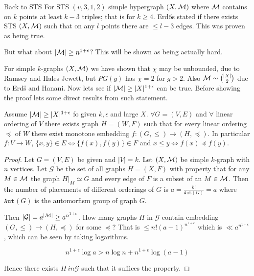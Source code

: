 \begin{topic}{Back to STS}
	For STS $(v,3,1,2)$ simple hypergraph $(X, \mathcal{M})$ where $\mathcal{M}$ contains on $k$ points at least $k-3$ triples; that is for $k \geq 4$. Erd\H os stated if there exists STS $(X, \mathcal{M})$ such that on any $l$ points there are $\leq l-3$ edges. This was proven as being true.
	
	But what about $|\mathcal{M}| \geq n^{1 + \epsilon}$? This will be shown as being actually hard.
\end{topic}

For simple $k$-graphs $(X, \mathcal{M})$ we have shown that $\chi$ may be unbounded, due to Ramsey and Hales Jewett, but $PG(g)$ has $\chi = 2$ for $g > 2$. Also $\mathcal{M} \sim \binom{|X|}{2}$ due to Erd\H s and Hanani. Now lets see if $|\mathcal{M}| \geq |X|^{1 + \epsilon}$ can be true. Before showing the proof lets some direct results from such statement.

\begin{thm}
	Assume $|\mathcal{M}| \geq |X|^{1 + \epsilon}$ fo given $k, \epsilon$ and large $X$. $\forall G = (V,E)$ and $\forall$ linear ordering of $V$ there exists graph $H = (W,F)$ such that for every linear ordering $\preceq$ of $W$ there exist monotone embedding $f : (G, \leq) \to (H, \preceq)$. In particular $f : V \to W$, $\{x,y\} \in E \iff \{f(x), f(y)\} \in F$ and $x \leq y \iff f(x) \preceq f(y)$.
\end{thm}

\begin{proof}
	Let $G = (V,E)$ be given and $|V| = k$. Let $(X, \mathcal{M})$ be simple $k$-graph with $n$ vertices. Let $\mathcal{G}$ be the set of all graphs $H = (X,F)$ with property that for any $M \in \mathcal{M}$ the graph $H|_M \simeq G$ and every edge of $F$ is a subset of an $M \in \mathcal{M}$. Then the number of placements of different orderings of $G$ is $a = \frac{k!}{\mathtt{Aut}(G)} = a$ where $\mathtt{Aut}(G)$ is the automorfism group of graph $G$.
		
	Then $|\mathcal{G}| = a^{|\mathcal{M}|} \geq a^{n^{1+\epsilon}}$. How many graphs $H$ in $\mathcal{G}$ contain embedding $(G, \leq) \to (H, \preceq)$ for some $\preceq$? That is $\leq n! (a - 1)^{n^{1+\epsilon}}$ which is $\ll a^{n^{1+\epsilon}}$, which can be seen by taking logarithms.
	
	$$
	n^{1 + \epsilon} \log a > n \log n + n^{1 + \epsilon} \log(a-1)
	$$
	
	\noindent Hence there exists $H \ in \mathcal{G}$ such that it suffices the property.
\end{proof}

